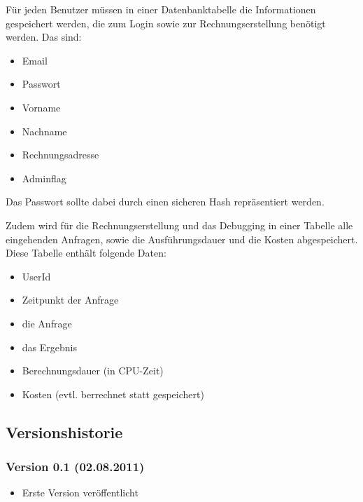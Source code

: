 \documentclass[ngerman]{scrartcl}
\begin{document}
	Für jeden Benutzer müssen in einer Datenbanktabelle die Informationen gespeichert werden, die zum Login sowie zur Rechnungserstellung benötigt werden. 
	Das sind:
	
	\begin{itemize}
		\item Email
		\item Passwort
		\item Vorname
		\item Nachname
		\item Rechnungsadresse
		\item Adminflag
	\end{itemize}
	
	Das Passwort sollte dabei durch einen sicheren Hash repräsentiert werden.
	
	Zudem wird für die Rechnungserstellung und das Debugging in einer Tabelle alle eingehenden Anfragen, sowie die Ausführungsdauer und die Kosten abgespeichert.
	Diese Tabelle enthält folgende Daten:
	
	\begin{itemize}
		\item UserId
		\item Zeitpunkt der Anfrage
		\item die Anfrage
		\item das Ergebnis
		\item Berechnungsdauer (in CPU-Zeit)
		\item Kosten (evtl. berrechnet statt gespeichert)
	\end{itemize}	

	\subsection{Versionshistorie}
	
	\subsubsection*{Version 0.1 (02.08.2011)}

	\begin{itemize}
		\item Erste Version veröffentlicht
	\end{itemize}
\end{document}
